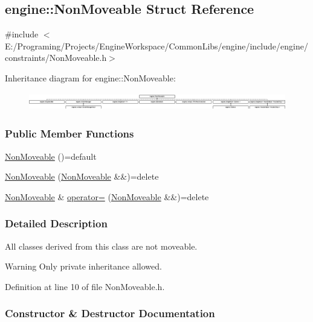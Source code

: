 \hypertarget{a00059}{}\subsection{engine\+:\+:Non\+Moveable Struct Reference}
\label{a00059}


{\ttfamily \#include $<$E\+:/\+Programing/\+Projects/\+Engine\+Workspace/\+Common\+Libs/engine/include/engine/constraints/\+Non\+Moveable.\+h$>$}

Inheritance diagram for engine\+:\+:Non\+Moveable\+:\begin{figure}[H]
\begin{center}
\leavevmode
\includegraphics[height=0.771704cm]{a00059}
\end{center}
\end{figure}
\subsubsection*{Public Member Functions}
\begin{DoxyCompactItemize}
\item 
\hyperlink{a00059_afc10190e7b658e00593b253c0d49cb35}{Non\+Moveable} ()=default
\item 
\hyperlink{a00059_a32b7d1f14280ffa724bd6404801a6bef}{Non\+Moveable} (\hyperlink{a00059}{Non\+Moveable} \&\&)=delete
\item 
\hyperlink{a00059}{Non\+Moveable} \& \hyperlink{a00059_ae233a63d597305bc8a2175eab7e498d8}{operator=} (\hyperlink{a00059}{Non\+Moveable} \&\&)=delete
\end{DoxyCompactItemize}


\subsubsection{Detailed Description}
All classes derived from this class are not moveable. \begin{DoxyWarning}{Warning}
Only private inheritance allowed. 
\end{DoxyWarning}


Definition at line 10 of file Non\+Moveable.\+h.



\subsubsection{Constructor \& Destructor Documentation}
